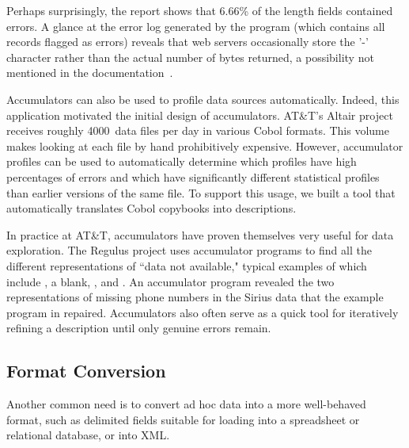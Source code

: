 \documentclass{sig-alternate}
\newcommand{\dibbler}{Sirius}
\newcommand{\ningaui}{Altair}
\newcommand{\darkstar}{Regulus}
\begin{document}
Perhaps surprisingly, the report shows that 6.66\% of the length
fields contained errors.  A glance at the error log generated
by the program (which contains all records flagged as errors) 
reveals that web servers occasionally store the '-' character
rather than the actual number of bytes returned, a possibility
not mentioned in the documentation~\cite{wpp}.

Accumulators can also be used to profile data sources automatically.
Indeed, this application motivated the initial design of accumulators.
AT\&T's \ningaui{} project receives roughly 4000~data files per day in various
Cobol formats.  This volume makes looking at each file by hand 
prohibitively expensive.  However, accumulator profiles can be used to 
automatically determine
which profiles have high percentages of errors and which have significantly
different statistical profiles than earlier versions of the same file.  
To support this usage, we built a tool that automatically translates
Cobol copybooks into \pads{} descriptions.

In practice at AT\&T, accumulators have proven themselves very useful for
data exploration.  The \darkstar{} project uses \pads{} accumulator programs
to find all the different representations of ``data not available,"  typical 
examples of which include , a blank, , and .
An accumulator program revealed the two representations
of missing phone numbers in the \dibbler{} data that the example program
in  repaired.
Accumulators also often serve as a quick tool for iteratively
refining a \pads{} description until only genuine errors remain.

\subsection{Format Conversion}
Another common need is to convert ad hoc data into a more well-behaved format, such as delimited fields suitable for loading into a spreadsheet or relational database, or into XML.  
\end{document}
